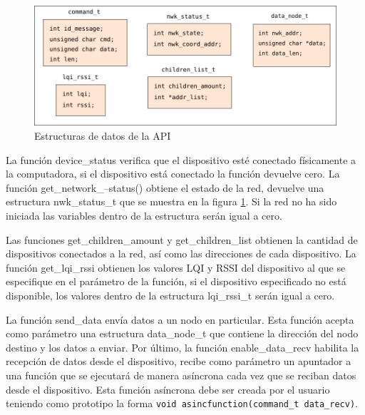 \begin{figure}
	\centering
	\includegraphics[scale=0.8]{capitulo_3_imgs/estructuras_comandos.pdf}
	\caption{Estructuras de datos de la API}
	\label{fig:diagrama_api_estructuras}
\end{figure}

La función device\_status verifica que el dispositivo esté conectado físicamente a la computadora, si el dispositivo está conectado la función devuelve cero. La función get\_network\_--status() obtiene el estado de la red, devuelve una estructura nwk\_status\_t que se muestra en la figura \ref{fig:diagrama_api_estructuras}. Si la red no ha sido iniciada las variables dentro de la estructura serán igual a cero. 

Las funciones get\_children\_amount y get\_children\_list obtienen la cantidad de dispositivos conectados a la red, así como las direcciones de cada dispositivo. La función get\_lqi\_rssi obtienen los valores LQI y RSSI del dispositivo al que se especifique en el parámetro de la función, si el dispositivo especificado no está disponible, los valores dentro de la estructura lqi\_rssi\_t serán igual a cero.  

La función send\_data envía datos a un nodo en particular. Esta función acepta como parámetro una estructura data\_node\_t que contiene la dirección del nodo destino y los datos a enviar. Por último, la función enable\_data\_recv habilita la recepción de datos desde el dispositivo, recibe como parámetro un apuntador a una función que se ejecutará de manera asíncrona cada vez que se reciban datos desde el dispositivo. Esta función asíncrona debe ser creada por el usuario teniendo como prototipo la forma \texttt{void asincfunction(command\_t data\_recv)}. 